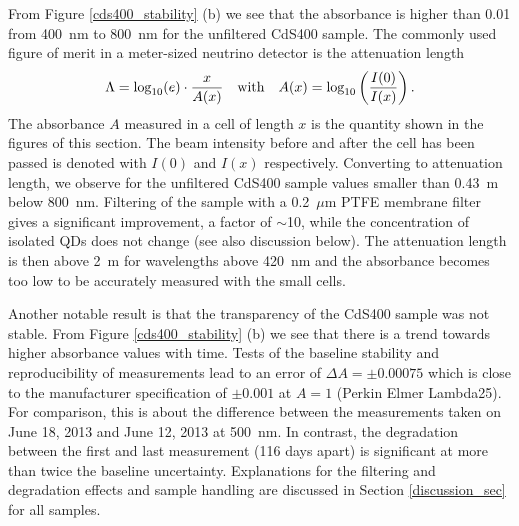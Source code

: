 \documentclass[cits]{JINST}
\begin{document}
From Figure \ref{cds400_stability} (b) we see that the absorbance is higher than 0.01 from 400~nm to 800~nm for the unfiltered CdS400 sample. The commonly used figure of merit in a meter-sized neutrino detector is the attenuation length
\begin{equation}
\Lambda = \textnormal{log}_{10}(e) \cdot \frac{x}{A(x)} \quad \textnormal{with} \quad A(x) = \textnormal{log}_{10} \left( \frac{I(0)}{I(x)} \right).   
\end{equation}  
The absorbance $A$ measured in a cell of length $x$ is the quantity shown in the figures of this section. The beam intensity before and after the cell has been passed is denoted with $I(0)$ and $I(x)$ respectively. Converting to attenuation length, we observe for the unfiltered CdS400 sample values smaller than 0.43~m below 800~nm. Filtering of the sample with a 0.2~$\mu$m PTFE membrane filter gives a significant improvement, a factor of $\sim$10, while the concentration of isolated QDs does not change (see also discussion below). The attenuation length is then above 2~m for wavelengths above 420~nm and the absorbance becomes too low to be accurately measured with the small cells. 
 
Another notable result is that the transparency of the CdS400 sample was not stable. From Figure \ref{cds400_stability} (b) we see that there is a trend towards higher absorbance values with time. Tests of the baseline stability and reproducibility of measurements lead to an error of $\Delta A = \pm 0.00075$ which is close to the manufacturer specification of $\pm 0.001$ at $A=1$ (Perkin Elmer Lambda25). For comparison, this is about the difference between the measurements taken on June 18, 2013 and June 12, 2013 at 500~nm. In contrast, the degradation between the first and last measurement (116 days apart) is significant at more than twice the baseline uncertainty. Explanations for the filtering and degradation effects and sample handling are discussed in Section \ref{discussion_sec} for all samples.  
\end{document}
